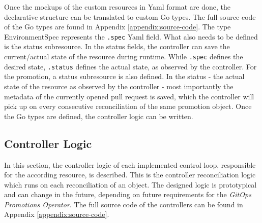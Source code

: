 Once the mockups of the custom resources in Yaml format are done,
the declarative structure can be translated to custom Go types.
The full source code of the Go types are found in Appendix \ref{appendix:source-code}.
The type EnvironmentSpec represents the \lstinline|.spec| Yaml field.
What also needs to be defined is the status subresource.
In the status fields, the controller can save the current/actual state
of the resource during runtime.
While \lstinline|.spec| defines the desired state,
\lstinline|.status| defines the actual state, as observed by the controller.
For the promotion,
a status subresource is also defined.
In the status - the actual state of the resource as observed by the controller -
most importantly the metadata of the currently opened pull request is saved,
which the controller will pick up on every consecutive reconciliation
of the same promotion object.
Once the Go types are defined,
the controller logic can be written.

\subsection{Controller Logic}
\label{prototype:design:controller-logic}

In this section,
the controller logic of each implemented control loop, responsible for the according resource,
is described.
This is the controller reconciliation logic which runs on each reconciliation of an object.
The designed logic is prototypical and can change in the future, depending on future requirements
for the \textit{GitOps Promotions Operator}.
The full source code of the controllers can be found in Appendix
\ref{appendix:source-code}.



